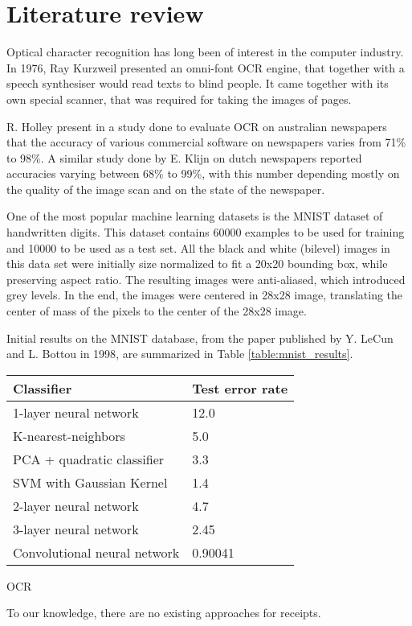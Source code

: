 \section{Literature review}
Optical character recognition has long been of interest in the computer industry. In 1976, Ray Kurzweil presented an omni-font OCR engine, that together with a speech synthesiser would read texts to blind people. It came together with its own special scanner, that was required for taking the images of pages. \cite{schantz1982history}

R. Holley present in a study\cite{Holley_2009} done to evaluate OCR on australian newspapers that the accuracy of various commercial software on newspapers varies from 71\% to 98\%. A similar study done by E. Klijn on dutch newspapers reported accuracies varying between 68\% to 99\%, with this number depending mostly on the quality of the image scan and on the state of the newspaper. 

One of the most popular machine learning datasets is the MNIST dataset of handwritten digits\cite{lecun1998mnist}. This dataset contains 60000 examples to be used for training and 10000 to be used as a test set. All the black and white (bilevel) images in this data set were initially size normalized to fit a 20x20 bounding box, while preserving aspect ratio. The resulting images were anti-aliased, which introduced grey levels. In the end, the images were centered in 28x28 image, translating the center of mass of the pixels to the center of the 28x28 image. 

Initial results on the MNIST database, from the paper published by Y. LeCun and L. Bottou in 1998\cite{Lecun_1998}, are summarized in Table \ref{table:mnist_results}. 

\begin{table}[h]
\begin{tabular}{ll}
\hline
Classifier                   & Test error rate \\ \hline
1-layer neural network       & 12.0            \\
K-nearest-neighbors          & 5.0             \\
PCA + quadratic classifier   & 3.3             \\
SVM with Gaussian Kernel     & 1.4             \\
2-layer neural network       & 4.7             \\
3-layer neural network       & 2.45            \\
Convolutional neural network & 0.90041         \\ \hline
\end{tabular}
\end{table}
OCR 

To our knowledge, there are no existing approaches for receipts.